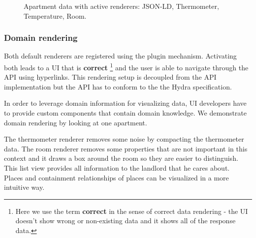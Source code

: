 \begin{figure}[!htb]
  \caption{Apartment data with active renderers: JSON-LD, Thermometer, Temperature, Room.}
  \label{fig:rooms}
\end{figure}

\subsubsection{Domain rendering}
Both default renderers are registered using the plugin mechanism. Activating both leads to a UI that is \textbf{correct} \footnote{Here we use the term \textbf{correct} in the sense of correct data rendering - the UI doesn't show wrong or non-existing data and it shows all of the response data.} and the user is able to navigate through the API using hyperlinks. This rendering setup is decoupled from the API implementation but the API has to conform to the the Hydra specification.

In order to leverage domain information for visualizing data, UI developers have to provide custom components that contain domain knowledge. We demonstrate domain rendering by looking at one apartment.

The thermometer renderer removes some noise by compacting the thermometer data. The room renderer removes some properties that are not important in this context and it draws a box around the room so they are easier to distinguish. This list view provides all information to the landlord that he cares about. \\
Places and containment relationships of places can be visualized in a more intuitive way.

